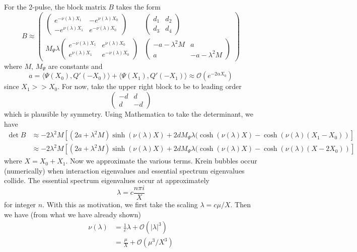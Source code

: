 \documentclass[thesis.tex]{subfiles}
\begin{document}
For the 2-pulse, the block matrix $B$ takes the form
\[
B \approx \begin{pmatrix}
\begin{pmatrix}
e^{-\nu(\lambda)X_1} & -e^{\nu(\lambda)X_0} \\
-e^{\nu(\lambda)X_1} & e^{-\nu(\lambda)X_0} 
\end{pmatrix} &
\begin{pmatrix}
d_1 & d_2 \\ d_3 & d_4
\end{pmatrix} \\
M_\Psi \lambda
\begin{pmatrix}
e^{-\nu(\lambda)X_1} & e^{\nu(\lambda)X_0} \\
e^{\nu(\lambda)X_1} & e^{-\nu(\lambda)X_0} 
\end{pmatrix} &
\begin{pmatrix}
-a - \lambda^2 M & a \\
a & -a - \lambda^2 M
\end{pmatrix}
\end{pmatrix}
\]
where $M$, $M_\Psi$ are constants and
\[
a = \langle \Psi(X_0), Q'(-X_0) \rangle
+ \langle \Psi(X_1), Q'(-X_1) \rangle \approx \mathcal{O}(e^{-2\alpha X_0})
\]
since $X_1 >> X_0$. For now, take the upper right block to be to leading order
\[
\begin{pmatrix}
-d & d \\ d & -d
\end{pmatrix} 
\] 
which is plausible by symmetry. Using Mathematica to take the determinant, we have
\begin{align*}
\det B &\approx -2 \lambda^2 M \left[ (2a + \lambda^2 M) \sinh(\nu(\lambda)X) + 2 d M_\Psi \lambda 
(\cosh(\nu(\lambda)X) - \cosh(\nu(\lambda)(X_1 - X_0))
\right] \\
&\approx -2 \lambda^2 M \left[ (2a + \lambda^2 M) \sinh(\nu(\lambda)X) + 2 d M_\Psi \lambda 
(\cosh(\nu(\lambda)X) - \cosh(\nu(\lambda)(X - 2 X_0))
\right]
\end{align*}
where $X = X_0 + X_1$. Now we approximate the various terms. Krein bubbles occur (numerically) when interaction eigenvalues and essential spectrum eigenvalues collide. The essential spectrum eigenvalues occur at approximately 
\[
\lambda = c \frac{n \pi i}{X}
\]
for integer $n$. With this as motivation, we first take the scaling $\lambda = c \mu / X$. Then we have (from what we have already shown)
\begin{align*}
\nu(\lambda) &= \frac{1}{c} \lambda + \mathcal{O}(|\lambda|^3) 
\\
&= \frac{\mu}{X} + \mathcal{O}(\mu^3 / X^3)
\end{align*}
\end{document}
